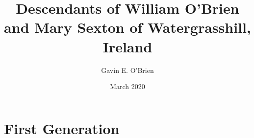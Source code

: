 \documentclass[oneside,letterpaper,12pt]{memoir}
\begin{document}
\author{Gavin E. O'Brien}
\title{Descendants of William O'Brien and Mary Sexton of Watergrasshill, Ireland}
\date{March 2020}

\maketitle
\tableofcontents

%


\chapter{First Generation}



\end{document}
